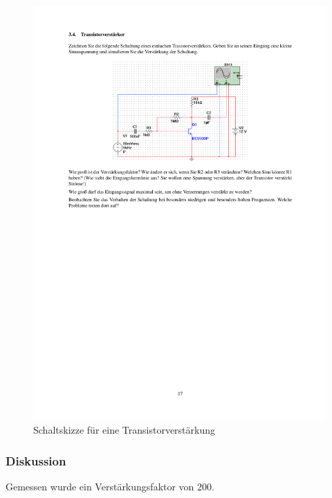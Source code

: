 \documentclass[12pt,a4paper]{article}
\begin{document}
\begin{figure}[H] 
  \centering
    \includegraphics[trim = 0mm 0mm 0mm 0mm, clip, scale = 1]{ep5_14[Page17].pdf}
  	\caption[verstärkung]{Schaltskizze für eine Transistorverstärkung}
  \label{fig:3.4}
\end{figure}

\subsubsection{Diskussion}
Gemessen wurde ein Verstärkungsfaktor von 200.
\end{document}
